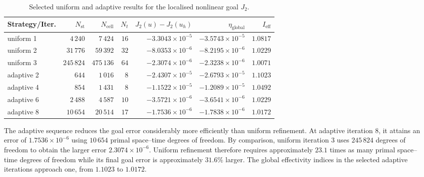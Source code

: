 \begin{table}[htbp]
\centering
\small
\setlength{\tabcolsep}{4pt}
\begin{tabular}{lrrrrrr}
\toprule
Strategy/Iter.
& \(N_{\mathrm{st}}\)
& \(N_{\mathrm{cell}}\)
& \(N_t\)
& \( J_2(u)-J_2(u_h)\)
& \(\eta_{\mathrm{global}}\)
& \(I_{\mathrm{eff}}\) \\
\midrule
uniform 1
& \(4\,240\)
& \(7\,424\)
& \(16\)
& \(-3.3043\times10^{-5}\)
& \(-3.5743\times10^{-5}\)
& \(1.0817\) \\

uniform 2
& \(31\,776\)
& \(59\,392\)
& \(32\)
& \(-8.0353\times10^{-6}\)
& \(-8.2195\times10^{-6}\)
& \(1.0229\) \\

uniform 3
& \(245\,824\)
& \(475\,136\)
& \(64\)
& \(-2.3074\times10^{-6}\)
& \(-2.3238\times10^{-6}\)
& \(1.0071\) \\

\midrule
adaptive 2
& \(644\)
& \(1\,016\)
& \(8\)
& \(-2.4307\times10^{-5}\)
& \(-2.6793\times10^{-5}\)
& \(1.1023\) \\

adaptive 4
& \(854\)
& \(1\,431\)
& \(8\)
& \(-1.1522\times10^{-5}\)
& \(-1.2089\times10^{-5}\)
& \(1.0492\) \\

adaptive 6
& \(2\,488\)
& \(4\,587\)
& \(10\)
& \(-3.5721\times10^{-6}\)
& \(-3.6541\times10^{-6}\)
& \(1.0229\) \\

adaptive 8
& \(10\,654\)
& \(20\,514\)
& \(17\)
& \(-1.7536\times10^{-6}\)
& \(-1.7838\times10^{-6}\)
& \(1.0172\) \\
\bottomrule
\end{tabular}
\caption{Selected uniform and adaptive results for the localised nonlinear goal \(J_2\).}
\label{tab:lshape-j2-results}
\end{table}

The adaptive sequence reduces the goal error considerably more efficiently than uniform refinement. At adaptive iteration \(8\), it attains an error of \(1.7536\times10^{-6}\) using \(10\,654\) primal space--time degrees of freedom. By comparison, uniform iteration \(3\) uses \(245\,824\) degrees of freedom to obtain the larger error \(2.3074\times10^{-6}\). Uniform refinement therefore requires approximately \(23.1\) times as many primal space--time degrees of freedom while its final goal error is approximately \(31.6\%\) larger. The global effectivity indices in the selected adaptive iterations approach one, from \(1.1023\) to \(1.0172\).

